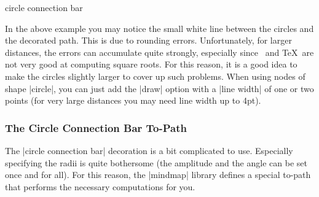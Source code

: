 \begin{decoration}{circle connection bar}
\begin{codeexample}[preamble={\usetikzlibrary{mindmap}}]
\end{codeexample}

    In the above example you may notice the small white line between the
    circles and the decorated path. This is due to rounding errors.
    Unfortunately, for larger distances, the errors can accumulate quite
    strongly, especially since \tikzname\ and \TeX\ are not very good at
    computing square roots. For this reason, it is a good idea to make the
    circles slightly larger to cover up such problems. When using nodes of
    shape |circle|, you can just add the |draw| option with a |line width| of
    one or two points (for very large distances you may need line width up to
    4pt).
\begin{codeexample}[preamble={\usetikzlibrary{mindmap}}]
\end{codeexample}

\end{decoration}


\subsubsection{The Circle Connection Bar To-Path}

The |circle connection bar| decoration is a bit complicated to use. Especially
specifying the radii is quite bothersome (the amplitude and the angle can be
set once and for all). For this reason, the |mindmap| library defines a special
to-path that performs the necessary computations for you.

